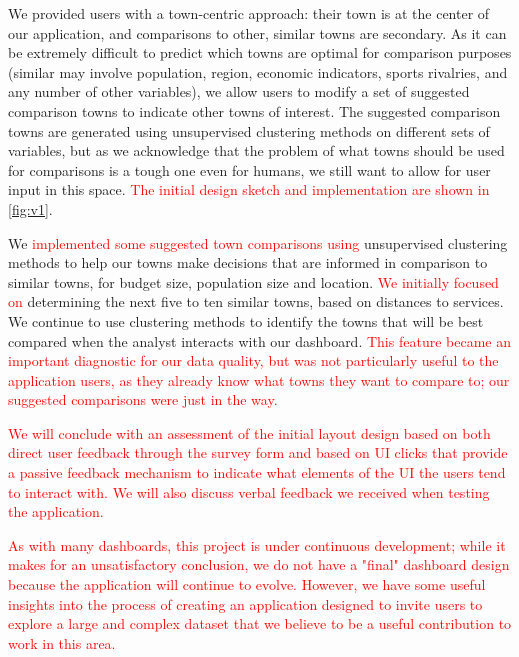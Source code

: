 \documentclass[letterpaper,inpress]{jdsart}
\begin{document}
We provided users with a town-centric approach: their town is at the center of our application, and comparisons to other, similar towns are secondary. As it can be extremely difficult to predict which towns are optimal for comparison purposes (similar may involve population, region, economic indicators, sports rivalries, and any number of other variables), we allow users to modify a set of suggested comparison towns to indicate other towns of interest. The suggested comparison towns are generated using unsupervised clustering methods on different sets of variables, but as we acknowledge that the problem of what towns should be used for comparisons is a tough one even for humans, we still want to allow for user input in this space. {\textcolor{red}{The initial design sketch and implementation are shown in}} \autoref{fig:v1}.

We {\textcolor{red}{implemented some suggested town comparisons using}} unsupervised clustering methods to help our towns make decisions that are informed in comparison to similar towns, for budget size, population size and location. {\textcolor{red}{We initially focused on}} determining the next five to ten similar towns, based on distances to services. We continue to use clustering methods to identify the towns that will be best compared when the analyst interacts with our dashboard. {\textcolor{red}{This feature became an important diagnostic for our data quality, but was not particularly useful to the application users, as they already know what towns they want to compare to; our suggested comparisons were just in the way.}}

{\textcolor{red}{We will conclude with an assessment of the initial layout design based on both direct user feedback through the survey form and based on UI clicks that provide a passive feedback mechanism to indicate what elements of the UI the users tend to interact with. We will also discuss verbal feedback we received when testing the application.}}

{\textcolor{red}{As with many dashboards, this project is under continuous development; while it makes for an unsatisfactory conclusion, we do not have a "final" dashboard design because the application will continue to evolve. However, we have some useful insights into the process of creating an application designed to invite users to explore a large and complex dataset that we believe to be a useful contribution to work in this area.}}
\end{document}

